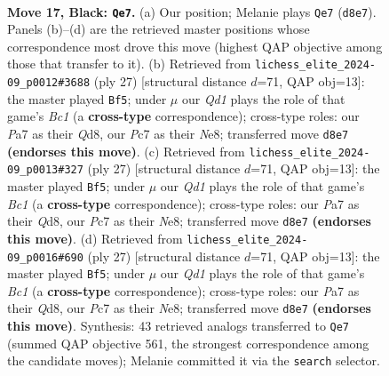 \documentclass[11pt]{article}
\begin{document}
\clearpage

\begin{figure}[p]\centering
\begin{subfigure}{0.46\textwidth}\centering
\resizebox{\linewidth}{!}{%
\newchessgame
\chessboard[
  setfen={r1bq2k1/pppp1ppp/1b1n4/3P4/8/2N1B2P/PPP1BPP1/R3Q1K1 b - - 6 17},
  showmover=false,
  pgfstyle=straightmove, color=movearrow, markmove={d8-e7}
]}
\caption{}
\end{subfigure}\hfill
\begin{subfigure}{0.46\textwidth}\centering
\resizebox{\linewidth}{!}{%
\newchessgame
\chessboard[
  setfen={r1bqn1k1/ppp2ppp/5b2/3p4/3P1B2/2P5/PP1N1PPP/R3QBK1 b - - 1 14},
  showmover=false,
  pgfstyle=straightmove, color=movearrow, markmove={c8-f5}
]}
\caption{}
\end{subfigure}
\\[4pt]
\begin{subfigure}{0.46\textwidth}\centering
\resizebox{\linewidth}{!}{%
\newchessgame
\chessboard[
  setfen={r1bqn1k1/ppp2ppp/5b2/3p4/3P1B2/2P5/PP1N1PPP/R3QBK1 b - - 1 14},
  showmover=false,
  pgfstyle=straightmove, color=movearrow, markmove={c8-f5}
]}
\caption{}
\end{subfigure}\hfill
\begin{subfigure}{0.46\textwidth}\centering
\resizebox{\linewidth}{!}{%
\newchessgame
\chessboard[
  setfen={r1bqn1k1/ppp2ppp/5b2/3p4/3P1B2/2P5/PP1N1PPP/R3QBK1 b - - 1 14},
  showmover=false,
  pgfstyle=straightmove, color=movearrow, markmove={c8-f5}
]}
\caption{}
\end{subfigure}
\caption{\textbf{Move 17, Black: \texttt{Qe7}.} (a) Our position; Melanie plays \texttt{Qe7} (\texttt{d8e7}). Panels (b)--(d) are the retrieved master positions whose correspondence most drove this move (highest QAP objective among those that transfer to it). (b) Retrieved from \texttt{lichess\_elite\_2024-09\_p0012\#3688} (ply 27) [structural distance $d$=71, QAP obj=13]: the master played \texttt{Bf5}; under $\mu$ our \emph{Qd1} plays the role of that game's \emph{Bc1} (a \textbf{cross-type} correspondence); cross-type roles: our \emph{P}a7 as their \emph{Q}d8, our \emph{P}c7 as their \emph{N}e8; transferred move \texttt{d8e7} \textbf{(endorses this move)}. (c) Retrieved from \texttt{lichess\_elite\_2024-09\_p0013\#327} (ply 27) [structural distance $d$=71, QAP obj=13]: the master played \texttt{Bf5}; under $\mu$ our \emph{Qd1} plays the role of that game's \emph{Bc1} (a \textbf{cross-type} correspondence); cross-type roles: our \emph{P}a7 as their \emph{Q}d8, our \emph{P}c7 as their \emph{N}e8; transferred move \texttt{d8e7} \textbf{(endorses this move)}. (d) Retrieved from \texttt{lichess\_elite\_2024-09\_p0016\#690} (ply 27) [structural distance $d$=71, QAP obj=13]: the master played \texttt{Bf5}; under $\mu$ our \emph{Qd1} plays the role of that game's \emph{Bc1} (a \textbf{cross-type} correspondence); cross-type roles: our \emph{P}a7 as their \emph{Q}d8, our \emph{P}c7 as their \emph{N}e8; transferred move \texttt{d8e7} \textbf{(endorses this move)}. Synthesis: 43 retrieved analogs transferred to \texttt{Qe7} (summed QAP objective 561, the strongest correspondence among the candidate moves); Melanie committed it via the \texttt{search} selector.}

\end{figure}
\end{document}
